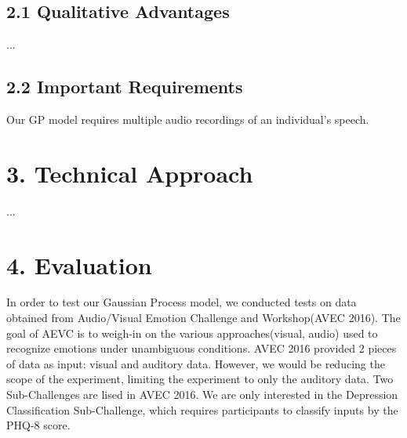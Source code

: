 \documentclass{article}
\begin{document}
	\subsection{2.1  Qualitative Advantages}
	... \\

	\subsection{2.2  Important Requirements}
	 Our GP model requires multiple audio recordings of an individual's speech. \\

	\section{3.  Technical Approach}
	... \\	

	\section{4.  Evaluation}
	In order to test our Gaussian Process model, we conducted tests on data obtained from Audio/Visual Emotion Challenge and Workshop(AVEC 2016). The goal of AEVC is to weigh-in on the various approaches(visual, audio) used to recognize emotions under unambiguous conditions. AVEC 2016 provided 2 pieces of data as input: visual and auditory data. However, we would be reducing the scope of the experiment, limiting the experiment to only the auditory data. Two Sub-Challenges are lised in AVEC 2016. We are only interested in the Depression Classification Sub-Challenge, which requires participants to classify inputs by the PHQ-8 score.
\end{document}

